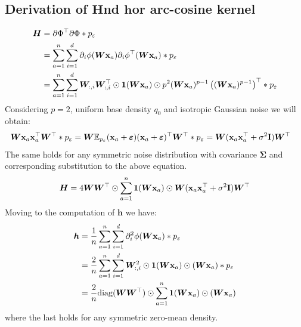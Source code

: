\subsection{Derivation of \texorpdfstring{$\bm H$} and \texorpdfstring{$\bm h$}
for arc-cosine kernel}
\label{sec:Hh_arccos}
\begin{align*}
        {\bm H}
        &= \partial \Phi^{\top}\partial \Phi * p_{\varepsilon}\\
        &= \sum\limits_{a = 1}^n\sum\limits_{i = 1}^d \partial_i \phi(\bm{W}{\bf x}_a)\partial_i \phi^{\top}(\bm{W}{\bf x}_a) * p_{\varepsilon}\\
        &= \sum\limits_{a = 1}^n\sum\limits_{i = 1}^d \bm{W}_{:, i}\bm{W}_{:, i}^\top \odot {\bf 1}(\bm{W}{\bf x}_a) \odot p^2(\bm{W}{\bf x}_a)^{p - 1}\left((\bm{W}{\bf x}_a)^{p - 1}\right)^{\top} * p_{\varepsilon}\\
        \label{eq:H_derivation}
    \end{align*}
    Considering $p = 2$, uniform base density $q_0$ and isotropic Gaussian noise we will obtain:
    \begin{align*}
        \bm{W}{\bf x}_a{\bf x}_a^{\top}\bm{W}^{\top} * p_{\varepsilon}
        & = \bm{W}\mathbb{E}_{p_{\varepsilon}}({\bf x}_a + {\bm \varepsilon})({\bf x}_a + {\bm \varepsilon})^{\top}\bm{W}^{\top} * p_{\varepsilon} = \bm{W}({\bf x}_a{\bf x}_a^{\top} + \sigma^2{\bf I})\bm{W}^{\top}
    \end{align*}
    The same holds for any symmetric noise distribution with covariance ${\bm \Sigma}$ and corresponding substitution to the above equation.
    \begin{equation}
        {\bm H} = 4\bm{W}\bm{W}^{\top} \odot \sum_{a = 1}^n{\bf 1}(\bm{W}{\bf x}_a) \odot \bm{W}({\bf x}_a{\bf x}_a^{\top} + \sigma^2{\bf I})\bm{W}^{\top}
    \end{equation}
    Moving to the computation of ${\bm h}$ we have:
    \begin{align*}
        {\bm h}
        &= \frac{1}{n}\sum_{a = 1}^n\sum_{i = 1}^d \partial_i^2 \phi(\bm{W}{\bf x}_a) * p_{\varepsilon}\\
        &= \frac{2}{n}\sum_{a = 1}^n\sum_{i = 1}^d \bm{W}_{:, i}^2 \odot {\bf 1}(\bm{W}{\bf x}_a) \odot (\bm{W}{\bf x}_a) * p_{\varepsilon}\\
        &= \frac{2}{n}{\rm diag}(\bm{W}\bm{W}^{\top}) \odot \sum_{a = 1}^n {\bf 1}(\bm{W}{\bf x}_a) \odot (\bm{W}{\bf x}_a)
    \end{align*}
    where the last holds for any symmetric zero-mean density.

